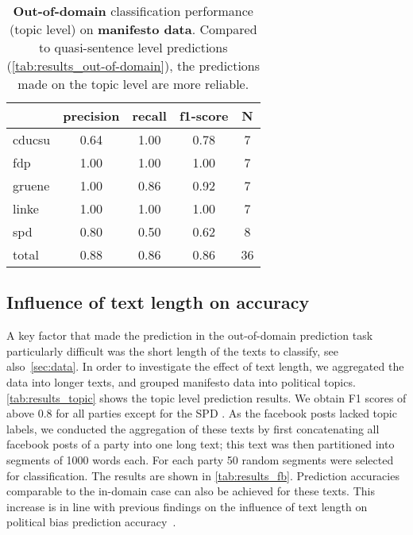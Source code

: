 \documentclass[11pt]{article}
\begin{document}
\begin{table}[t]
\caption{
\label{tab:results_topic}
{\bf Out-of-domain} classification performance (topic level) on {\bf manifesto data}. Compared to quasi-sentence level predictions (\autoref{tab:results_out-of-domain}), the predictions made on the topic level are more reliable.}
\begin{center}
\begin{tabular}{lcccc}
    &         precision    &recall &  f1-score  & N  \\
    \hline
        \hline
cducsu     &  0.64  &    1.00  &    0.78    &     7\\
       fdp    &   1.00    &  1.00    &  1.00    &     7\\
    gruene  &     1.00  &    0.86  &    0.92    &     7\\
     linke    &   1.00   &   1.00     & 1.00    &     7\\
       spd   &    0.80   &   0.50    &  0.62     &    8\\
    \hline
total  &     0.88   &   0.86   &   0.86  &      36\\
\end{tabular}
\end{center}
\end{table}


\subsection{Influence of text length on accuracy}
A key factor that made the prediction in the out-of-domain prediction task particularly difficult was the short length of the texts to classify, see also~\autoref{sec:data}. In order to investigate the effect of text length, we aggregated the data into longer texts, and grouped manifesto data into political topics. \autoref{tab:results_topic} shows the topic level prediction results. We obtain F1 scores of above 0.8 for all parties except for the SPD . As the facebook posts lacked topic labels, we conducted the aggregation of these texts by first concatenating all facebook posts of a party into one long text; this text was then partitioned into segments of 1000 words each. For each party 50 random segments were selected for classification. The results are shown in \autoref{tab:results_fb}. Prediction accuracies comparable to the in-domain case can also be achieved for these texts. This increase is in line with previous findings on the influence of text length on political bias prediction accuracy~\cite{Hirst2014}. 
\end{document}
